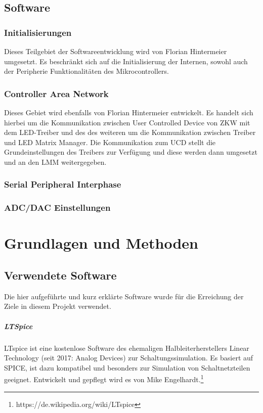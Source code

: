 \documentclass[paper=a4, 12pt]{scrreprt}
\begin{document}
    \section{Software}
    	\subsection{Initialisierungen}
    	Dieses Teilgebiet der Softwareentwicklung wird von Florian Hintermeier umgesetzt. Es beschränkt sich auf die Initialisierung der Internen, sowohl auch der Peripherie Funktionalitäten des Mikrocontrollers.
    	\subsection{Controller Area Network}
    	Dieses Gebiet wird ebenfalls von Florian Hintermeier entwickelt. Es handelt sich hierbei um die Kommunikation zwischen User Controlled Device von ZKW mit dem LED-Treiber und des des weiteren um die Kommunikation zwischen Treiber und LED Matrix Manager.
    	Die Kommunikation zum UCD stellt die Grundeinstellungen des Treibers zur Verfügung und diese werden dann umgesetzt und an den LMM weitergegeben.
    	\subsection{Serial Peripheral Interphase}
    	\subsection{ADC/DAC Einstellungen}

\chapter{Grundlagen und Methoden}
	\section{Verwendete Software}
	Die hier aufgeführte und kurz erklärte Software wurde für die Erreichung der Ziele in diesem Projekt verwendet.
	
	\paragraph{LTSpice}\hfill \break
	LTspice ist eine kostenlose Software des ehemaligen Halbleiterherstellers Linear Technology (seit 2017: Analog Devices) zur Schaltungssimulation. Es basiert auf SPICE, ist dazu kompatibel und besonders zur Simulation von Schaltnetzteilen geeignet. Entwickelt und gepflegt wird es von Mike Engelhardt.\footnote{https://de.wikipedia.org/wiki/LTspice}
\end{document}
